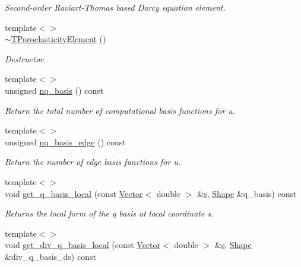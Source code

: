 \begin{DoxyCompactItemize}
\begin{DoxyCompactList}\small\item\em Second-\/order Raviart-\/\+Thomas based Darcy equation element. \end{DoxyCompactList}\item 
{\footnotesize template$<$$>$ }\\\hyperlink{classoomph_1_1TPoroelasticityElement_a8de01a7962eed4906d9d77399c6ccbdf}{$\sim$\+T\+Poroelasticity\+Element} ()
\begin{DoxyCompactList}\small\item\em Destructor. \end{DoxyCompactList}\item 
{\footnotesize template$<$$>$ }\\unsigned \hyperlink{classoomph_1_1TPoroelasticityElement_a0e7bb4a27c8d609ee6cb5abb6cc63c81}{nq\+\_\+basis} () const
\begin{DoxyCompactList}\small\item\em Return the total number of computational basis functions for u. \end{DoxyCompactList}\item 
{\footnotesize template$<$$>$ }\\unsigned \hyperlink{classoomph_1_1TPoroelasticityElement_a983a46fd022fae7bf5a4120a526a4e86}{nq\+\_\+basis\+\_\+edge} () const
\begin{DoxyCompactList}\small\item\em Return the number of edge basis functions for u. \end{DoxyCompactList}\item 
{\footnotesize template$<$$>$ }\\void \hyperlink{classoomph_1_1TPoroelasticityElement_a89c64563c231e0a2ec05212c93c0adec}{get\+\_\+q\+\_\+basis\+\_\+local} (const \hyperlink{classoomph_1_1Vector}{Vector}$<$ double $>$ \&\hyperlink{cfortran_8h_ab7123126e4885ef647dd9c6e3807a21c}{s}, \hyperlink{classoomph_1_1Shape}{Shape} \&q\+\_\+basis) const
\begin{DoxyCompactList}\small\item\em Returns the local form of the q basis at local coordinate s. \end{DoxyCompactList}\item 
{\footnotesize template$<$$>$ }\\void \hyperlink{classoomph_1_1TPoroelasticityElement_a6999bf7f38c269d952fe56cff1f701ca}{get\+\_\+div\+\_\+q\+\_\+basis\+\_\+local} (const \hyperlink{classoomph_1_1Vector}{Vector}$<$ double $>$ \&\hyperlink{cfortran_8h_ab7123126e4885ef647dd9c6e3807a21c}{s}, \hyperlink{classoomph_1_1Shape}{Shape} \&div\+\_\+q\+\_\+basis\+\_\+ds) const

\end{DoxyCompactItemize}

